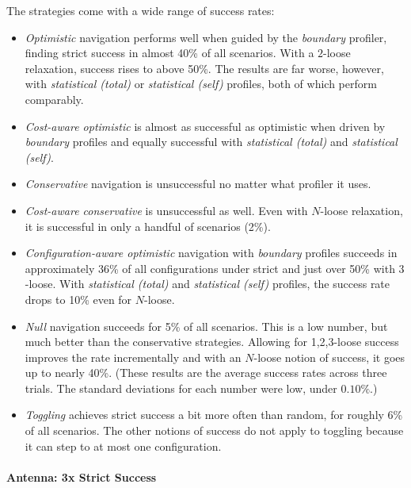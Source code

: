 The strategies come with a wide range of success rates: 
\begin{itemize}
  \item
    \emph{Optimistic} navigation performs well when guided by the \emph{boundary} profiler,
    finding strict success in almost 40\% of all scenarios. 
    With a $2$-loose relaxation, success rises to above 50\%.
    The results are far worse, however, with \emph{statistical (total)} or \emph{statistical (self)}
    profiles, both of which perform comparably.

  \item
    \emph{Cost-aware optimistic} is almost as successful as optimistic when driven
    by \emph{boundary} profiles and equally successful with \emph{statistical (total)}
    and \emph{statistical (self)}.

  \item
    \emph{Conservative} navigation is unsuccessful no matter what profiler it uses.

  \item
    \emph{Cost-aware conservative} is unsuccessful as well.
    Even with $N$-loose relaxation, it is successful in only a handful of scenarios (2\%).

  \item
    \emph{Configuration-aware optimistic} navigation with
    \emph{boundary} profiles succeeds in approximately 36\% of all
    configurations under strict and just over 50\% with $3$-loose.
    With \emph{statistical (total)} and \emph{statistical (self)} profiles,
    the success rate drops to 10\% even for $N$-loose.

  \item
    \emph{Null} navigation succeeds for 5\% of all scenarios.
    This is a low number, but much better than the conservative strategies.
    Allowing for 1,2,3-loose success improves the rate incrementally and with an
    $N$-loose notion of success, it goes up to nearly 40\%.
    (These results are the average success rates across three trials. The standard deviations
    for each number were low, under $0.10\%$.)

  \item
    \emph{Toggling} achieves strict success a bit more often than random, for
    roughly 6\% of all scenarios.
    The other notions of success do not apply to toggling because it can step to at most one configuration.
\end{itemize}

\paragraph{Antenna: 3x Strict Success} \label{s:antenna}

